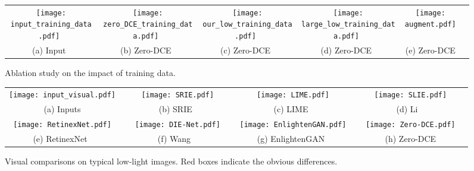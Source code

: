 \documentclass[10pt,twocolumn,letterpaper]{article}
\begin{document}
\begin{figure*}[t]
	\begin{center}
		\begin{tabular}{c@{ }c@{ }c@{ }c@{ }c@{ }c}
			\texttt{[image: input\_training\_data.pdf]}~&
			\texttt{[image: zero\_DCE\_training\_data.pdf]}~&
			\texttt{[image: our\_low\_training\_data.pdf]}~&
			\texttt{[image: large\_low\_training\_data.pdf]}~&
			\texttt{[image: augment.pdf]}\\
			(a) Input~& (b) Zero-DCE~& (c) Zero-DCE~& (d) Zero-DCE~& (e) Zero-DCE\\
		\end{tabular}
	\end{center}
	\vspace{-0.5cm}
	\caption{Ablation study on the impact of training data.}
	\vspace{-0.2cm}
	\label{fig:trainingdata}
\end{figure*}




\begin{figure*}
	\begin{center}
		\begin{tabular}{c@{ }c@{ }c@{ }c@{ }c@{ }}
			\texttt{[image: input\_visual.pdf]}&~~
			\texttt{[image: SRIE.pdf]}&~~
			\texttt{[image: LIME.pdf]}&~~
			\texttt{[image: SLIE.pdf]}\\
			(a) Inputs &~~  (b) SRIE~\cite{Fu2016}  &~~ (c)  LIME~\cite{Guo2017} &~~ (d) Li \etal~\cite{Li2018} \\
			\texttt{[image: RetinexNet.pdf]}&~~
			\texttt{[image: DIE-Net.pdf]}&~~
			\texttt{[image: EnlightenGAN.pdf]}&~~
			\texttt{[image: Zero-DCE.pdf]}\\
			(e) RetinexNet~\cite{Chen2018} &~~ (f)  Wang \etal~\cite{Wang2019} &~~ (g) EnlightenGAN~\cite{Jiang2019} &~~ (h) Zero-DCE\\
		\end{tabular}
	\end{center}
	\vspace{-0.5cm}
	\caption{Visual comparisons on typical low-light images. Red boxes indicate the obvious differences. }
	\label{fig:visual_results}
	\vspace{-0.5cm}
\end{figure*}
\end{document}
